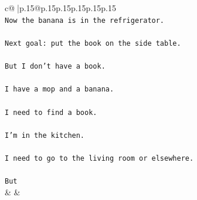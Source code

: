 \documentclass{article}
\begin{document}
{\begin{supertabular}{c@{$\;$}|p{.15\linewidth}@{}p{.15\linewidth}p{.15\linewidth}p{.15\linewidth}p{.15\linewidth}p{.15\linewidth}}
{{{\\ 
\texttt{Now the banana is in the refrigerator.} \\
\\ 
\texttt{Next goal: put the book on the side table.} \\
\\ 
\texttt{But I don't have a book.} \\
\\ 
\texttt{I have a mop and a banana.} \\
\\ 
\texttt{I need to find a book.} \\
\\ 
\texttt{I'm in the kitchen.} \\
\\ 
\texttt{I need to go to the living room or elsewhere.} \\
\\ 
\texttt{But} \\
            }
        }
    }
    & & \\ \\


\end{supertabular}}
\end{document}
